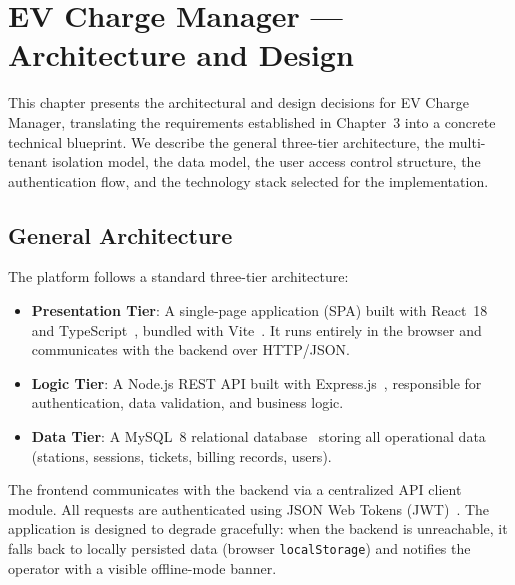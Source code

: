 \documentclass[12pt,a4paper]{report}
\begin{document}

\chapter{EV Charge Manager --- Architecture and Design}

This chapter presents the architectural and design decisions for EV Charge Manager, translating
the requirements established in Chapter~3 into a concrete technical blueprint. We describe the
general three-tier architecture, the multi-tenant isolation model, the data model, the user
access control structure, the authentication flow, and the technology stack selected for the
implementation.

\section{General Architecture}

The platform follows a standard three-tier architecture:

\begin{itemize}
  \item \textbf{Presentation Tier}: A single-page application (SPA) built with React~18 and
        TypeScript~\autocite{react_docs, typescript_docs}, bundled with Vite~\autocite{vite_docs}. It
        runs entirely in the browser and communicates with the backend over HTTP/JSON.

  \item \textbf{Logic Tier}: A Node.js REST API built with Express.js~\autocite{nodejs_express},
        responsible for authentication, data validation, and business logic.

  \item \textbf{Data Tier}: A MySQL~8 relational database~\autocite{mysql_docs} storing all
        operational data (stations, sessions, tickets, billing records, users).
\end{itemize}

The frontend communicates with the backend via a centralized API client module. All requests are
authenticated using JSON Web Tokens (JWT)~\autocite{rfc7519}. The application is designed to
degrade gracefully: when the backend is unreachable, it falls back to locally persisted data
(browser \texttt{localStorage}) and notifies the operator with a visible offline-mode banner.
\end{document}
